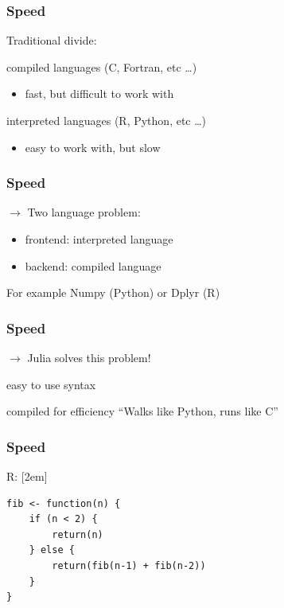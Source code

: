 \documentclass[notes]{beamer}
\def\\{}%
\newenvironment{wideitemize}{
    \itemize\addtolength{\itemsep}{15pt}\addtolength{\topsep}{10pt}}{\enditemize}
\begin{document}
    \begin{frame}
    \frametitle{Speed}
    Traditional divide:
    \vspace{1cm}
        \begin{wideitemize}
            \item compiled languages (C, Fortran, etc \ldots)
            \begin{itemize}
             \item fast, but difficult to work with
            \end{itemize}
            \item interpreted languages (R, Python, etc \ldots)
            \begin{itemize}
             \item easy to work with, but slow
            \end{itemize}
        \end{wideitemize}
    \end{frame}

    \begin{frame}
    \frametitle{Speed}
    $\rightarrow$ Two language problem:
        \begin{itemize}
            \item frontend: interpreted language
            \item backend: compiled language
        \end{itemize}
    \vspace{1cm}
    For example Numpy (Python) or Dplyr (R)
    \end{frame}
    \begin{frame}
    \frametitle{Speed}
    $\rightarrow$ Julia solves this problem!
    \vspace{1cm}
        \begin{wideitemize}
            \item easy to use syntax
            \item compiled for efficiency
        \end{wideitemize}
    \vspace{1cm}
    ``Walks like Python, runs like C''
    \end{frame}

    \begin{frame}[fragile]
    \frametitle{Speed}
    R: \\[2em]
            \begin{verbatim}
fib <- function(n) {
    if (n < 2) {
        return(n)
    } else {
        return(fib(n-1) + fib(n-2))
    }
}
            \end{verbatim}
    \end{frame}
\end{document}

